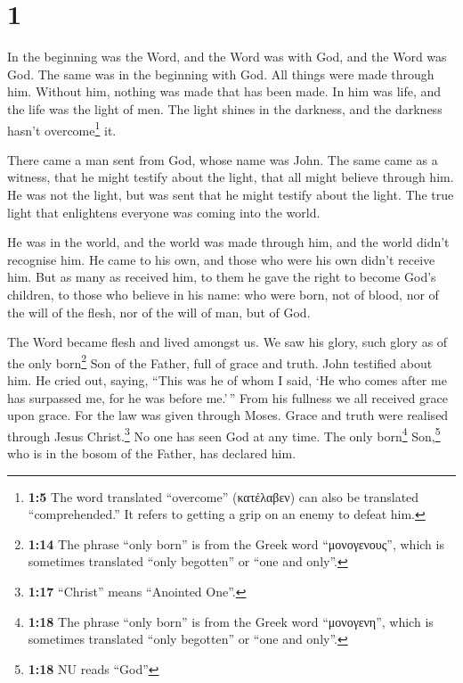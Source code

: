 \hypertarget{section}{%
\section{1}\label{section}}

 In the beginning was the Word, and the Word was with God,
and the Word was God.  The same was in the beginning with
God.  All things were made through him. Without him,
nothing was made that has been made.  In him was life, and
the life was the light of men.  The light shines in the
darkness, and the darkness hasn't overcome\footnote{\textbf{1:5} The
  word translated ``overcome'' (κατέλαβεν) can also be translated
  ``comprehended.'' It refers to getting a grip on an enemy to defeat
  him.} it.

 There came a man sent from God, whose name was John.
 The same came as a witness, that he might testify about
the light, that all might believe through him.  He was not
the light, but was sent that he might testify about the light.
 The true light that enlightens everyone was coming into
the world.

 He was in the world, and the world was made through him,
and the world didn't recognise him.  He came to his own,
and those who were his own didn't receive him.  But as
many as received him, to them he gave the right to become God's
children, to those who believe in his name:  who were
born, not of blood, nor of the will of the flesh, nor of the will of
man, but of God.

 The Word became flesh and lived amongst us. We saw his
glory, such glory as of the only born\footnote{\textbf{1:14} The phrase
  ``only born'' is from the Greek word ``μονογενους'', which is
  sometimes translated ``only begotten'' or ``one and only''.} Son of
the Father, full of grace and truth.  John testified
about him. He cried out, saying, ``This was he of whom I said, `He who
comes after me has surpassed me, for he was before me.'\,''
 From his fullness we all received grace upon grace.
 For the law was given through Moses. Grace and truth
were realised through Jesus Christ.\footnote{\textbf{1:17} ``Christ''
  means ``Anointed One''.}  No one has seen God at any
time. The only born\footnote{\textbf{1:18} The phrase ``only born'' is
  from the Greek word ``μονογενη'', which is sometimes translated ``only
  begotten'' or ``one and only''.} Son,\footnote{\textbf{1:18} NU reads
  ``God''} who is in the bosom of the Father, has declared him.

